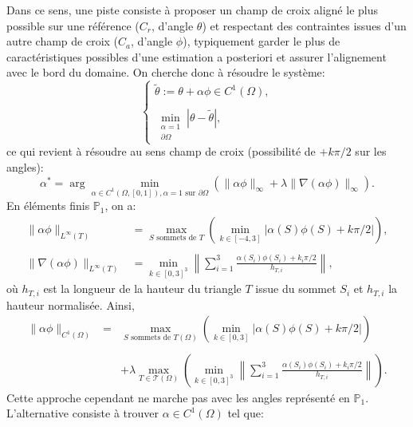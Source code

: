 Dans ce sens, une piste consiste à proposer un champ de croix aligné le plus possible sur une référence ($C_r$, d'angle $\theta$) et respectant des contraintes issues d'un autre champ de croix ($C_a$, d'angle $\phi$), typiquement garder le plus de caractéristiques possibles d'une estimation a posteriori et assurer l'alignement avec le bord du domaine. On cherche donc à résoudre le système:
\begin{equation}
\begin{cases}
    \tilde{\theta} := \theta + \alpha\phi \in C^1(\Omega), \\\\
    \min_{\substack{\alpha=1 \\ \partial\Omega}} \left\lvert \theta - \tilde{\theta} \right\rvert,
\end{cases}
\end{equation}
ce qui revient à résoudre au sens champ de croix (possibilité de $+k\pi/2$ sur les angles):
$$
\alpha^* = \arg\min_{\alpha\in C^1(\Omega,[0,1]), \alpha=1 \text{ sur } \partial\Omega} \left( \lVert \alpha\phi \rVert_\infty + \lambda \lVert \nabla (\alpha\phi) \rVert_\infty \right).
$$
En éléments finis $\mathbb{P}_1$, on a:
\begin{equation}
\begin{aligned}
    \lVert \alpha\phi \rVert_{L^\infty(T)} &= \max_{S \text{ sommets de } T} \left( \min_{k\in[-4,3]} \left\lvert \alpha(S)\phi(S) + k\pi/2 \right\rvert \right), \\\\
    \lVert \nabla (\alpha\phi) \rVert_{L^\infty(T)} &= \min_{k\in[0,3]^3} \left\lVert \sum_{i=1}^{3} \frac{\alpha(S_i)\phi(S_i) + k_i\pi/2}{h_{T,i}} \right\rVert,
\end{aligned}
\end{equation}
où $h_{T,i}$ est la longueur de la hauteur du triangle $T$ issue du sommet $S_i$ et $h_{T,i}$ la hauteur normalisée. Ainsi,
\[
\begin{array}{lcl}
\lVert \alpha\phi \rVert_{C^1(\Omega)} &=& \max_{S \text{ sommets de } T (\Omega)} \left( \min_{k\in[0,3]} \left\lvert \alpha(S)\phi(S) + k\pi/2 \right\rvert \right)\\\\
&&+ \lambda \max_{T\in\mathcal{T}(\Omega)} \left( \min_{k\in[0,3]^3} \left\lVert \sum_{i=1}^{3} \frac{\alpha(S_i)\phi(S_i) + k_i\pi/2}{h_{T,i}} \right\rVert \right).
\end{array}
\]
Cette approche cependant ne marche pas avec les angles représenté en $\mathbb{P}_1$. L'alternative consiste à trouver $\alpha \in C^1(\Omega)$ tel que:
